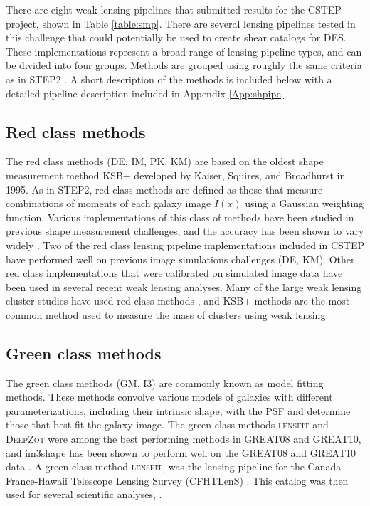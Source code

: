 There are eight weak lensing pipelines that submitted 
results for the CSTEP project, shown in Table \ref{table:smp}.
There are several lensing pipelines tested in this challenge that could potentially
be used to create shear catalogs for DES. These implementations
represent a broad range of lensing pipeline types, and can be divided
into four groups. Methods are grouped using roughly the same criteria 
as in STEP2 \citep{STEP2}. A short description of the methods is
included below with a detailed pipeline description included in
Appendix \ref{App:shpipe}.\\

\subsection{Red class methods}
The red class methods (DE, IM, PK, KM) are based on the oldest 
shape measurement method KSB+ developed by Kaiser, Squires, and Broadhurst in 1995. As in STEP2, red class methods are
defined as those that measure combinations of
moments of each galaxy image $I(x)$ using a Gaussian 
weighting function. Various implementations
of this class of methods have been studied in previous shape
measurement challenges, and the accuracy has been shown 
to vary widely \citep{STEP2, GREAT10}.  Two of the red class lensing
pipeline implementations included in CSTEP have performed well on
previous image simulations challenges (DE, KM). Other 
red class implementations that were calibrated on
simulated image data have been used in several recent 
weak lensing analyses\citep[e.g.][]{Gruen_s, Apple, TS}. Many of the
large weak lensing cluster studies have used red class
methods \citep{HH}, and KSB+ methods are the most common
method used to measure the mass of clusters using weak lensing.
 
\subsection{Green class methods}
The green class methods (GM, I3) are commonly known as model fitting
methods. These methods convolve various models of galaxies with different 
parameterizations, including their intrinsic shape, with the PSF and
determine those that best fit the galaxy image. The green class methods
\textsc{lensfit} and \textsc{DeepZot} were among the best performing 
methods in GREAT08 and GREAT10, and im3shape has been shown 
to perform well on the GREAT08 and GREAT10 data \citep{Jzun}. 
A green class method \textsc{lensfit}, was 
the lensing pipeline for the Canada-France-Hawaii 
Telescope Lensing Survey (CFHTLenS) \citep{CHey}. This catalog 
was then used for several scientific analyses, \citep[e.g.][]{CH1,
  CH2, CH3}. 

